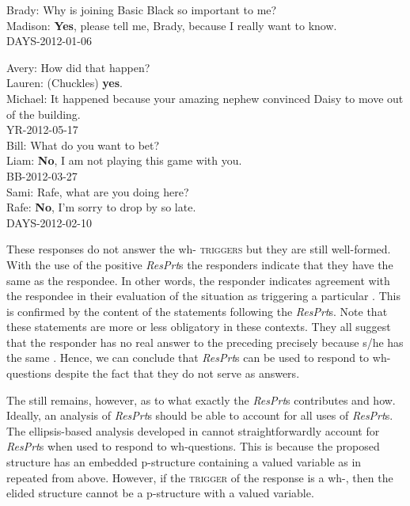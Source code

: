 \documentclass[output=paper]{LSP/langsci}
\begin{document}
\ea\label{ex:wiltschko:30}
Brady:     {Why is joining Basic Black so important to me?} \\
Madison:   \textbf{{Yes}}{, please tell me, Brady, because I really want to know.}\\
DAYS-2012-01-06
\z


\ea\label{ex:wiltschko:31}
Avery:   {How did that happen?} \\
Lauren:   (Chuckles) \textbf{{yes}}. \\
Michael:   {It happened because your amazing nephew convinced Daisy to move out of the building.}\\
YR-2012-05-17\\[\baselineskip]

Bill:     {What do you want to bet?} \\
Liam:     \textbf{No}, I am not playing this game with you.\\
BB-2012-03-27\\[\baselineskip]

Sami:     {Rafe, what are you doing here?} \\
Rafe:     \textbf{{No}}{, I'm sorry to drop by so late.}\\
DAYS-2012-02-10
\z

\noindent These responses do not answer the wh- \textsc{triggers} but they are still well-formed.
With the use of the positive \textit{ResPrt}s the responders indicate that they have the same  as the respondee.
In other words, the responder indicates agreement with the respondee in their evaluation of the situation as triggering a particular . This is confirmed by the content of the statements following the \textit{ResPrt}s. Note that these statements are more or less obligatory in these contexts. They all suggest that the responder has no real answer to the preceding  precisely because s/he has the same . Hence, we can conclude that \textit{ResPrt}s can be used to respond to wh-questions despite the fact that they do not serve as answers. 

The  still remains, however, as to what exactly the \textit{ResPrt}s contributes and how. Ideally, an analysis of \textit{ResPrt}s should be able to account for all uses of \textit{ResPrt}s. The ellipsis-based analysis developed in \citet{holmberg:15} cannot straightforwardly account for \textit{ResPrt}s when used to respond to wh-questions. This is because the proposed structure has an embedded p-structure containing a valued  variable as in  repeated from  above.
However, if the \textsc{trigger} of the response is a wh-, then the elided structure cannot be a p-structure with a valued  variable.
\end{document}
